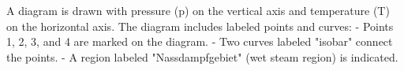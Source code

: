 A diagram is drawn with pressure (p) on the vertical axis and temperature (T) on the horizontal axis. The diagram includes labeled points and curves:  
- Points 1, 2, 3, and 4 are marked on the diagram.  
- Two curves labeled "isobar" connect the points.  
- A region labeled "Nassdampfgebiet" (wet steam region) is indicated.